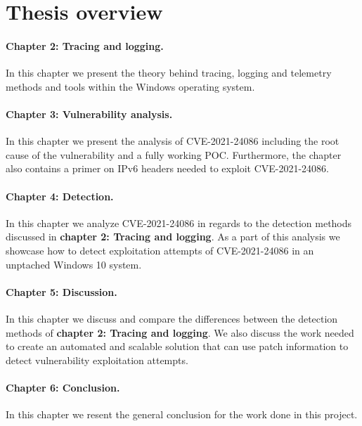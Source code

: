 \documentclass{report}
\begin{document}
\section{Thesis overview}
\paragraph{Chapter 2: Tracing and logging.} In this chapter we present the theory behind tracing, logging and telemetry methods and tools within the Windows operating system.

\paragraph{Chapter 3: Vulnerability analysis.} In this chapter we present the analysis of CVE-2021-24086 including the root cause of the vulnerability and a fully working \gls{POC}. Furthermore, the chapter also contains a primer on IPv6 headers needed to exploit CVE-2021-24086.

\paragraph{Chapter 4: Detection.} In this chapter we analyze CVE-2021-24086 in regards to the detection methods discussed in \textbf{chapter 2: Tracing and logging}. As a part of this analysis we showcase how to detect exploitation attempts of CVE-2021-24086 in an unptached Windows 10 system.

\paragraph{Chapter 5: Discussion.} In this chapter we discuss and compare the differences between the detection methods of \textbf{chapter 2: Tracing and logging}. We also discuss the work needed to create an automated and scalable solution that can use patch information to detect vulnerability exploitation attempts.

\paragraph{Chapter 6: Conclusion.} In this chapter we resent the general conclusion for the work done in this project.
\end{document}
